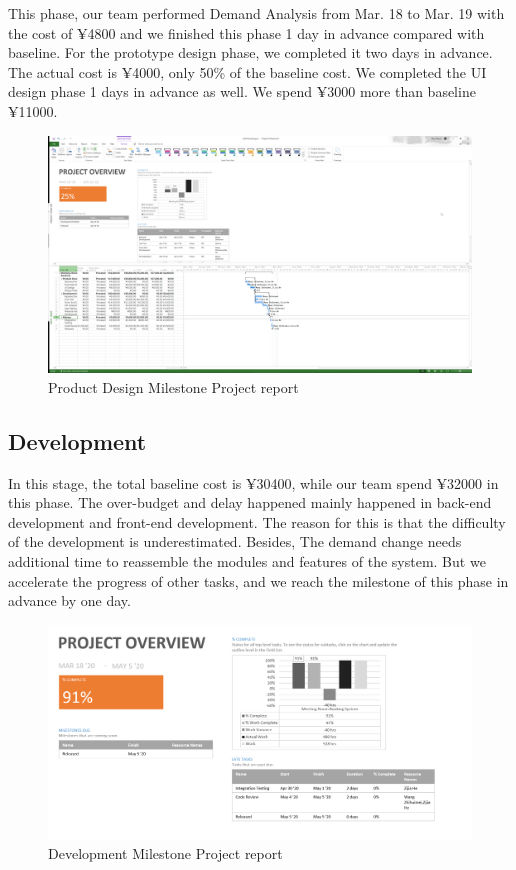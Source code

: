 \documentclass[runningheads]{llncs}
\begin{document}
\noindent This phase, our team performed Demand Analysis from Mar. 18 to Mar. 19 with the cost of ¥4800 and we finished this phase 1 day in advance compared with baseline. For the prototype design phase, we completed it two days in advance. The actual cost is ¥4000, only 50\% of the baseline cost. We completed the UI design phase 1 days in advance as well. We spend ¥3000 more than baseline ¥11000.

\begin{figure}[H]
  \centering
  \includegraphics[width=1.0\textwidth]{figure/projrep1}
  \caption{Product Design Milestone Project report}
\end{figure}

\subsection{Development}
In this stage, the total baseline cost is ¥30400, while our team spend ¥32000 in this phase. The over-budget and delay happened mainly happened in back-end development and front-end development. The reason for this is that the difficulty of the development is underestimated. Besides, The demand change needs additional time to reassemble the modules and features of the system. But we accelerate the progress of other tasks, and we reach the milestone of this phase in advance by one day.

\begin{figure}[H]
  \centering
  \includegraphics[width=1.0\textwidth]{figure/projrep2}
  \caption{Development Milestone Project report}
\end{figure}
\end{document}
